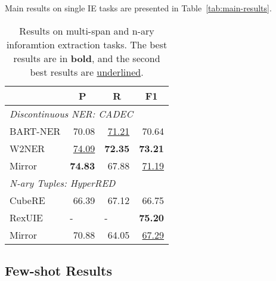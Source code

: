 Main results on single IE tasks are presented in Table~\ref{tab:main-results}.

\begin{table}[]
  \centering
  \begin{tabular}{lrrr}
    \toprule
    & \multicolumn{1}{c}{P} & \multicolumn{1}{c}{R} & \multicolumn{1}{c}{F1} \\
    \midrule
    \multicolumn{4}{l}{\textit{Discontinuous NER: CADEC}}                           \\
    BART-NER & 70.08                 & \underline{ 71.21}           & 70.64                  \\
    W2NER    & \underline{ 74.09}           & \textbf{72.35}        & \textbf{73.21}         \\
    Mirror   & \textbf{74.83}        & 67.88                 & \underline{ 71.19}            \\
    \midrule
    \multicolumn{4}{l}{\textit{N-ary Tuples: HyperRED}}                             \\
    CubeRE   & 66.39                 & 67.12                 & 66.75                  \\
    RexUIE   & \multicolumn{1}{l}{-} & \multicolumn{1}{l}{-} & \textbf{75.20}         \\
    Mirror   & 70.88                 & 64.05                 & \underline{ 67.29} \\
    \bottomrule
  \end{tabular}%
  \caption{
    Results on multi-span and n-ary inforamtion extraction tasks.
    The best results are in \textbf{bold}, and the second best results are \underline{underlined}.
  }
  \label{tab:multi-span-n-ary-results}
\end{table}

\subsection{Few-shot Results}

